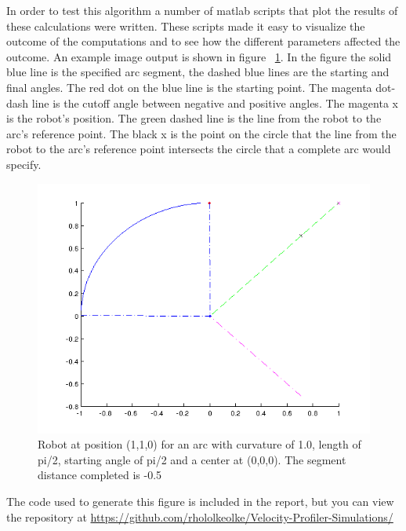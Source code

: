 In order to test this algorithm a number of matlab scripts that plot the results of these calculations were written. These scripts made it easy to visualize the outcome of the computations and to see how the different parameters affected the outcome. An example image output is shown in figure ~\ref{fig:arcComputationExample}. In the figure the solid blue line is the specified arc segment, the dashed blue lines are the starting and final angles. The red dot on the blue line is the starting point. The magenta dot-dash line is the cutoff angle between negative and positive angles. The magenta x is the robot's position. The green dashed line is the line from the robot to the arc's reference point. The black x is the point on the circle that the line from the robot to the arc's reference point intersects the circle that a complete arc would specify.

\FloatBarrier

\begin{figure}[h]

  \includegraphics{images/arcComputationExample1.png}
  \caption{Robot at position (1,1,0) for an arc with curvature of 1.0, length of pi/2, starting angle of pi/2 and a center at (0,0,0). The segment distance completed is -0.5}
  \label{fig:arcComputationExample}
  
\end{figure}

\FloatBarrier

The code used to generate this figure is included in the report, but you can view the repository at \url{https://github.com/rhololkeolke/Velocity-Profiler-Simulations/}

